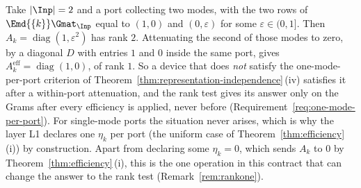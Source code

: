 
\begin{remark}\label{rem:effrank}
Take $|\Inp|=2$ and a port collecting two modes, with the two rows of
$\Emd{\{k\}}\Gmat_{\Inp}$ equal to $(1,0)$ and $(0,\varepsilon)$ for some
$\varepsilon\in(0,1]$. Then $A_k=\operatorname{diag}(1,\varepsilon^2)$ has rank
$2$. Attenuating the second of those modes to zero, by a diagonal $D$ with
entries $1$ and $0$ inside the same port, gives
$A_k^{\mathrm{eff}}=\operatorname{diag}(1,0)$, of rank $1$. So a device that
does \emph{not} satisfy the one-mode-per-port criterion of
Theorem~\ref{thm:representation-independence}\,(iv) satisfies it after a within-port attenuation, and
the rank test gives its answer only on the Grams after every efficiency is
applied, never before (Requirement~\ref{req:one-mode-per-port}). For
single-mode ports the situation never arises, which is why the layer L1
declares one $\eta_k$ per port (the uniform case of
Theorem~\ref{thm:efficiency}\,(i)) by construction. Apart from declaring some
$\eta_k=0$, which sends $A_k$ to $0$ by Theorem~\ref{thm:efficiency}\,(i), this
is the one operation in this contract that can change the answer to the rank
test (Remark~\ref{rem:rankone}).
\end{remark}
